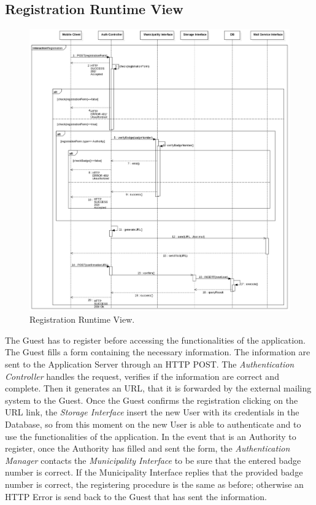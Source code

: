 \documentclass{report}
\begin{document}
\subsection{Registration Runtime View}
\begin{figure}[!ht]
	\begin{center}
	\includegraphics[width=\textwidth]{img/Registration.png}
    \end{center}
    \label{fig:RegistrationSD}
	\caption{Registration Runtime View.}
\end{figure}
The Guest has to register before accessing the functionalities of the application. The Guest fills a form containing the necessary information. The information are sent to the Application Server through an HTTP POST. The \textit{Authentication Controller} handles the request, verifies if the information are correct and complete. Then it generates an URL, that it is forwarded by the external mailing system to the Guest. Once the Guest confirms the registration clicking on the URL link, the \textit{Storage Interface} insert the new User with its credentials in the Database, so from this moment on the new User is able to authenticate and to use the functionalities of the application.
In the event that is an Authority to register, once the Authority has filled and sent the form, the \textit{Authentication Manager} contacts the \textit{Municipality Interface} to be sure that the entered badge number is correct. If the Municipality Interface replies that the provided badge number is correct, the registering procedure is the same as before; otherwise an HTTP Error is send back to the Guest that has sent the information.    
\end{document}
